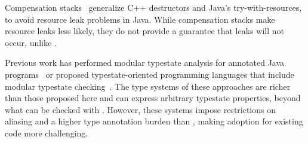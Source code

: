 Compensation stacks~\cite{WeimerN04} generalize C++ destructors and Java's
try-with-resources, to avoid resource leak problems in Java.  While
compensation stacks make resource leaks less likely, they do not provide a
guarantee that leaks will not occur, unlike \tool.

Previous work has performed modular typestate analysis for annotated Java
programs~\cite{BierhoffA2007} or proposed typestate-oriented programming
languages that include modular typestate
checking~\cite{AldrichSSS2009,garcia2014typestate}.  The type systems of these
approaches are richer than those proposed here and can express arbitrary
typestate properties, beyond what can be checked with \tool.
However, these systems impose restrictions on aliasing and a
higher type annotation burden than \tool, making adoption for existing code
more challenging.






